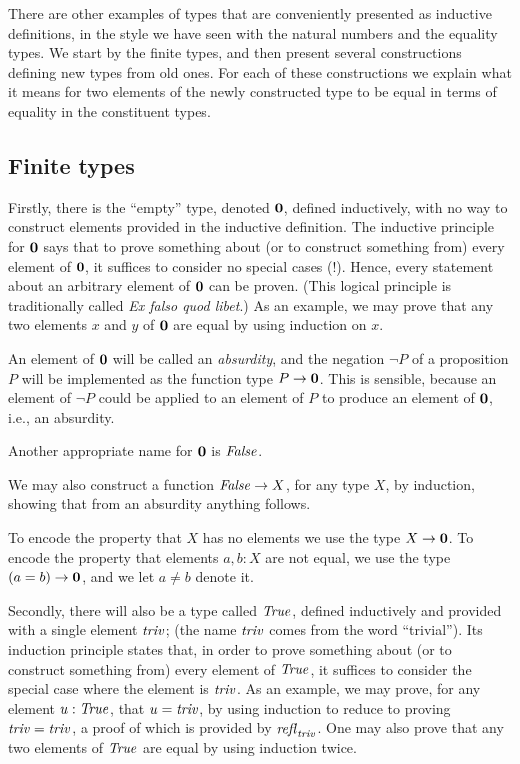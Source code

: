There are other examples of types that are conveniently presented as 
inductive definitions, in the style we have seen with the natural numbers
and the equality types.  We start by the finite types, and then
present several constructions defining new types from old ones.
For each of these constructions we explain what it means for two 
elements of the newly constructed type to be equal in terms of
equality in the constituent types.

\subsection{Finite types}
\label{sec:finite-types}
Firstly, there is the ``empty'' type, denoted $\mathbf{0} $, defined inductively, with no way to construct elements provided in the inductive
definition.  The inductive principle for $\mathbf{0} $ says that to prove something about (or to construct something from) every element of
$\mathbf{0} $, it suffices to consider no special cases (!).  Hence, every statement about an arbitrary element of $\mathbf{0} $ can be proven. (This logical principle is traditionally called {\em Ex falso quod libet}.) As
an example, we may prove that any two elements $x$ and $y$ of $\mathbf{0} $ are equal by using induction on $x$.

An element of $\mathbf{0} $ will be called an \emph{absurdity}, and the negation $\neg P$ of a proposition $P$ will be implemented as the function
type $P \to \mathbf{0} $.  This is sensible, because an element of $\neg P$ could be applied to an element of $P$ to produce an element of
$\mathbf{0} $, i.e., an absurdity.

Another appropriate name for $\mathbf{0} $ is $\mathop{\mathit{False}}$.

We may also construct a function $\mathop{\mathit{False}} \to X$, for any type $X$, by induction, showing that from an absurdity anything follows.

To encode the property that $X$ has no elements we use the type $X \to \mathbf{0} $.  To encode the property that elements $a,b:X$ are not equal,
we use the type $(a=b) \to \mathbf{0} $, and we let $a \ne b$ denote it.

Secondly, there will also be a type called $\mathop{\mathit{True}}$, defined inductively and provided with a single element $\mathop{\mathit{triv}}$; (the name $\mathop{\mathit{triv}}$ comes from the word
  ``trivial'').  Its induction principle
states that, in order to prove something about (or to construct something from) every element of $\mathop{\mathit{True}}$, it suffices to consider the special
case where the element is $\mathop{\mathit{triv}}$.  As an example, we may prove, for any element $u : \mathop{\mathit{True}}$, that $u=\mathop{\mathit{triv}}$, by using induction to reduce
to proving $\mathop{\mathit{triv}}=\mathop{\mathit{triv}}$, a proof of which is provided by $\mathop{{\it refl}_{\mathop{\mathit{triv}}}}$.  One may also prove that any two elements of $\mathop{\mathit{True}}$ are equal by using induction twice.


